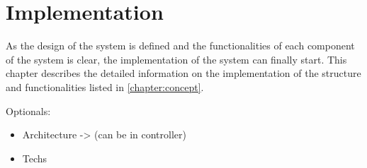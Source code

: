 \chapter{Implementation}

As the design of the system is defined and the functionalities of each component of the system is clear, the implementation of the system can finally start. This chapter describes the detailed information on the implementation of the structure and functionalities listed in \autoref{chapter:concept}.







Optionals:
\begin{itemize}
  \item Architecture -> (can be in controller)
  \item Techs 
\end{itemize}